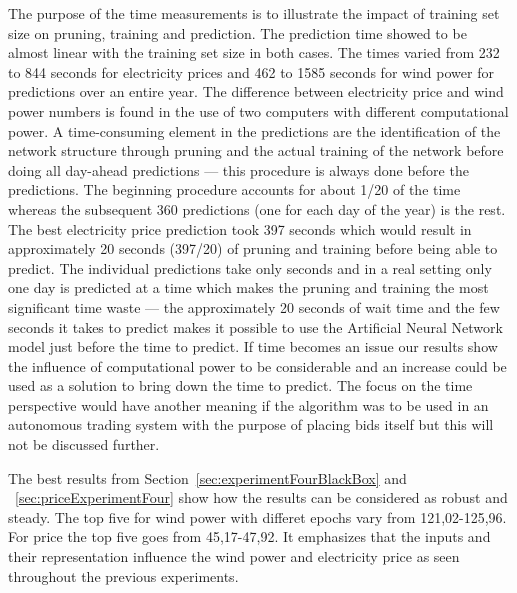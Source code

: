 The purpose of the time measurements is to illustrate the impact of training set size on pruning, training and prediction. The prediction time showed to be almost linear with the training set size in both cases. The times varied from 232 to 844 seconds for electricity prices and 462 to 1585 seconds for wind power for predictions over an entire year. The difference between electricity price and wind power numbers is found in the use of two computers with different computational power. A time-consuming element in the predictions are the identification of the network structure through pruning and the actual training of the network before doing all day-ahead predictions --- this procedure is always done before the predictions. The beginning procedure accounts for about 1/20 of the time whereas the subsequent 360 predictions (one for each day of the year) is the rest. The best electricity price prediction took 397 seconds which would result in approximately 20 seconds (397/20) of pruning and training before being able to predict. The individual predictions take only seconds and in a real setting only one day is predicted at a time which makes the pruning and training the most significant time waste --- the approximately 20 seconds of wait time and the few seconds it takes to predict makes it possible to use the Artificial Neural Network model just before the time to predict. If time becomes an issue our results show the influence of computational power to be considerable and an increase could be used as a solution to bring down the time to predict. The focus on the time perspective would have another meaning if the algorithm was to be used in an autonomous trading system with the purpose of placing bids itself but this will not be discussed further.  

The best results from Section~\ref{sec:experimentFourBlackBox} and ~\ref{sec:priceExperimentFour} show how the results can be considered as robust and steady. The top five for wind power with differet epochs vary from 121,02-125,96. For price the top five goes from 45,17-47,92. It emphasizes that the inputs and their representation influence the wind power and electricity price as seen throughout the previous experiments.